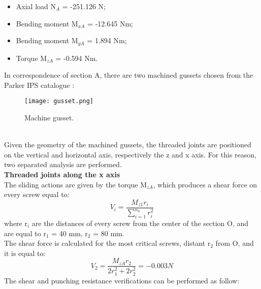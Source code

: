 \begin{itemize}
\item Axial load N$_{A}$ = -251.126 N;
\item Bending moment M$_{xA}$ = -12.645 Nm; 
\item Bending moment M$_{yA}$ = 1.894 Nm; 
\item Torque M$_{zA}$ = -0.594 Nm.
\end{itemize}
In correspondence of section A, there are two machined gussets chosen from the Parker IPS catalogue \cite{parker-ds}: \\
\begin{figure}[h!]
    \centering
    \texttt{[image: gusset.png]}
    \caption{Machine gusset.}
    \label{fig: gusset}
\end{figure}\\
Given the geometry of the machined gussets, the threaded joints are positioned on the vertical and horizontal axis, respectively the z and x axis.  For this reason, two separated analysis are performed. \vspace{5mm} \\
\textbf{Threaded joints along the x axis}\\
The sliding actions are given by the torque M$_{zA}$, which produces a shear force on every screw equal to:\\
\begin{equation}
    V_{i} = \frac{M_{z1}r_{i}}{\sum\limits_{i=1}^{n_{{b}}} r^2_{i}}
\end{equation}
where r$_{i}$ are the distances of every screw from the center of the section O, and are equal to r$_{1}$ = 40 mm, r$_{2}$ = 80 mm.\\
The shear force is calculated for the most critical screws, distant r$_{2}$ from O, and it is equal to:\\
\begin{equation}
    V_{2} = \frac{M_{zA}r_{2}}{2r^2_{1}+2r^2_{2}} = -0.003 N
\end{equation}
The shear and punching resistance verifications can be performed as follow:
